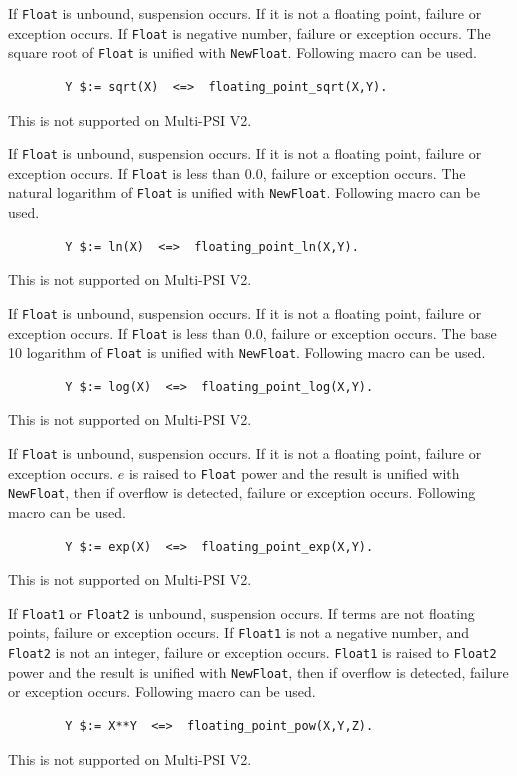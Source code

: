 \begin{itemize}
If \verb|Float| is unbound, suspension occurs.
If it is not a floating point, failure or exception occurs.
If \verb|Float| is negative number, failure or exception occurs.
The square root of \verb|Float| is unified with \verb|NewFloat|.
Following macro can be used.
\begin{verbatim}
        Y $:= sqrt(X)  <=>  floating_point_sqrt(X,Y).
\end{verbatim}
\Caution This is not supported on Multi-PSI V2.

If \verb|Float| is unbound, suspension occurs.
If it is not a floating point, failure or exception occurs.
If \verb|Float| is less than 0.0, failure or exception occurs.
The natural logarithm of \verb|Float| is unified with \verb|NewFloat|.
Following macro can be used.
\begin{verbatim}
        Y $:= ln(X)  <=>  floating_point_ln(X,Y).
\end{verbatim}
\Caution This is not supported on Multi-PSI V2.

If \verb|Float| is unbound, suspension occurs.
If it is not a floating point, failure or exception occurs.
If \verb|Float| is less than 0.0, failure or exception occurs.
The base 10 logarithm of \verb|Float| is unified with \verb|NewFloat|.
Following macro can be used.
\begin{verbatim}
        Y $:= log(X)  <=>  floating_point_log(X,Y).
\end{verbatim}
\Caution This is not supported on Multi-PSI V2.

If \verb|Float| is unbound, suspension occurs.
If it is not a floating point, failure or exception occurs.
$e$ is raised to \verb|Float| power and
the result is unified with \verb|NewFloat|,
then if overflow is detected, failure or exception occurs.
Following macro can be used.
\begin{verbatim}
        Y $:= exp(X)  <=>  floating_point_exp(X,Y).
\end{verbatim}
\Caution This is not supported on Multi-PSI V2.

If \verb|Float1| or \verb|Float2| is unbound, suspension occurs.
If terms are not floating points, failure or exception occurs.
If \verb|Float1| is not a negative number, and \verb|Float2| is not an integer,
failure or exception occurs.
\verb|Float1| is raised to \verb|Float2| power
and the result is unified with \verb|NewFloat|,
then if overflow is detected, failure or exception occurs.
Following macro can be used.
\begin{verbatim}
        Y $:= X**Y  <=>  floating_point_pow(X,Y,Z).
\end{verbatim}
\Caution This is not supported on Multi-PSI V2.


\end{itemize}
